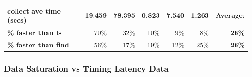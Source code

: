 \documentclass[12pt]{article}
\begin{document}
\begin{center}
\begin{tabular}{|l|r|r|r|r|r|l|}
    \textbf{collect ave time (secs)} & \textbf{19.459}                   & \textbf{78.395}                   & \textbf{0.823}                                                                           & \textbf{7.540}                                                                              & \textbf{1.263}                                                                                & \textbf{Average:}                  \\ \hline
    \textbf{\% faster than ls}       & 70\%                              & 32\%                              & 10\%                                                                                     & 9\%                                                                                         & 8\%                                                                                           & \multicolumn{1}{r|}{\textbf{26\%}} \\ \hline
    \textbf{\% faster than find}     & 56\%                              & 17\%                              & 19\%                                                                                     & 12\%                                                                                        & 25\%                                                                                          & \multicolumn{1}{r|}{\textbf{26\%}} \\ \hline
    \end{tabular}
  \label{tab:CollectionAlgorithmData}
\end{center}

\newpage
\subsubsection{Data Saturation vs Timing Latency Data}
\end{document}
